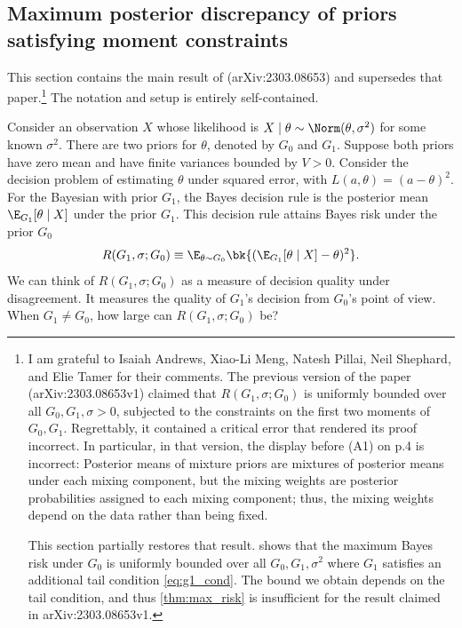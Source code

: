 \documentclass[12pt, reqno]{amsart}
\numberwithin{equation}{section}
\begin{document}
\begin{refsection}
\begin{appendices}
\section{Maximum posterior discrepancy of priors satisfying moment constraints}
\label{asec:max_gauss}

This section contains the main result of \citet{chen2023bayesrisk} (arXiv:2303.08653) and
supersedes that paper.\footnote{\label{fn:error}I am grateful to Isaiah Andrews, Xiao-Li
Meng, Natesh
Pillai, Neil Shephard, and Elie Tamer for their comments. The previous version of the
paper (arXiv:2303.08653v1) claimed that $R (G_1, \sigma; G_0)$ is uniformly bounded over
all $G_0, G_1, \sigma>0$, subjected to the constraints on the first two moments of
$G_0,G_1$. Regrettably, it contained a critical error that rendered its proof incorrect.
In particular, in that version, the display before (A1) on p.4 is incorrect: Posterior
means of mixture priors are mixtures of posterior means under each mixing component, but
the mixing weights are posterior probabilities assigned to each mixing component; thus,
the mixing weights depend on the data rather than being fixed.

This section partially restores that result. 
shows that the maximum Bayes risk under $G_0$ is uniformly bounded over all $G_0, G_1,
\sigma^2$ where $G_1$ satisfies an additional tail condition \eqref{eq:g1_cond}. The
bound we obtain depends on the tail condition, and thus \cref{thm:max_risk} is insufficient
for the result claimed in arXiv:2303.08653v1.} The
notation and setup is entirely self-contained.



Consider an observation $X$ whose likelihood is $X \mid \theta \sim \Norm(\theta,
\sigma^2)$ for some known
$\sigma^2$. There are two priors for $\theta$, denoted by $G_0$ and $G_1$. Suppose both
priors have zero mean and have finite variances bounded by $V > 0$. Consider the decision
problem of estimating $\theta$ under squared error, with $L(a,\theta) = (a-\theta)^2$. For
the Bayesian with prior $G_1$, the Bayes decision rule is the posterior mean $\E_{G_1}
[\theta \mid X]$ under the prior $G_1$. This decision rule attains Bayes risk under the
prior $G_0$\[
R(G_1, \sigma; G_0) \equiv \E_{\theta \sim G_0}\bk{
  (\E_{G_1}[\theta \mid X] - \theta)^2
}. 
\] We can think of $R(G_1, \sigma; G_0)$ as a measure of decision quality under
 disagreement. It measures the quality of $G_1$'s decision from $G_0$'s point of view.
 When $G_1 \neq G_0$, how large can $R (G_1,
\sigma; G_0)$ be?



\end{appendices}
\end{refsection}
\end{document}
